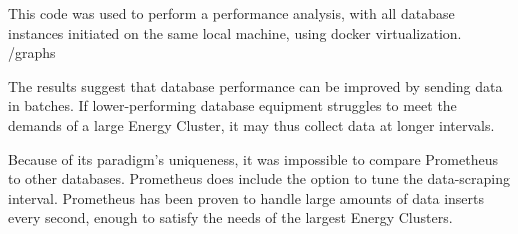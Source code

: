 \par This code was used to perform a performance analysis, with all database instances initiated on the same local machine, using docker virtualization. 
/{graphs}
\par The results suggest that database performance can be improved by sending data in batches. If lower-performing database equipment struggles to meet the demands of a large Energy Cluster, it may thus collect data at longer intervals.
\par Because of its paradigm's uniqueness, it was impossible to compare Prometheus to other databases. Prometheus does include the option to tune the data-scraping interval. Prometheus has been proven to handle large amounts of data inserts every second, enough to satisfy the needs of the largest Energy Clusters. \citep{prometheusSoundcloud}
